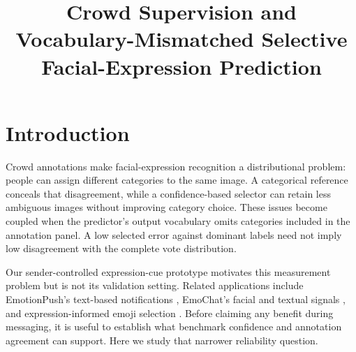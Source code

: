 \documentclass[pdflatex,sn-mathphys-num]{sn-jnl}
\begin{document}
\title[Crowd supervision and selective prediction]{Crowd Supervision and Vocabulary-Mismatched Selective Facial-Expression Prediction}
\author[1]{ }
\author[2]{ }
\author*[3]{ }
\author[4]{ }
\abstract{}
\maketitle

\section{Introduction}
Crowd annotations make facial-expression recognition a distributional problem: people can assign different categories to the same image. A categorical reference conceals that disagreement, while a confidence-based selector can retain less ambiguous images without improving category choice. These issues become coupled when the predictor's output vocabulary omits categories included in the annotation panel. A low selected error against dominant labels need not imply low disagreement with the complete vote distribution.

Our sender-controlled expression-cue prototype motivates this measurement problem but is not its validation setting. Related applications include EmotionPush's text-based notifications \cite{wang2016emotionpush}, EmoChat's facial and textual signals \cite{chong2019emochat}, and expression-informed emoji selection \cite{liu2019selfawareness}. Before claiming any benefit during messaging, it is useful to establish what benchmark confidence and annotation agreement can support. Here we study that narrower reliability question.
\end{document}
